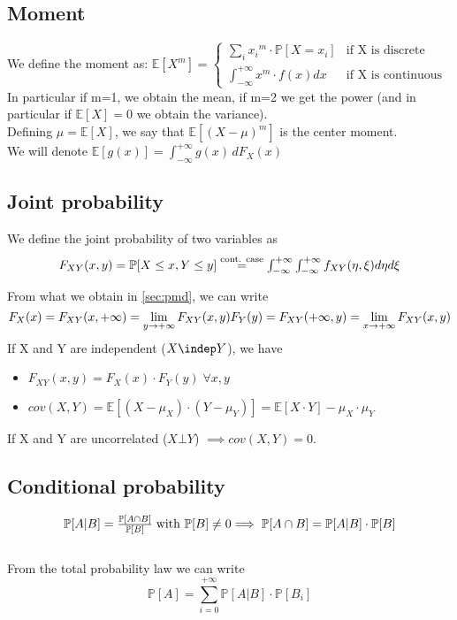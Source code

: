 \subsection{Moment}
We define  the moment as:
$\mathbb{E}[X^m]=
\begin{cases}
    \sum\limits_{i} {x{_i}^{m} \cdot \mathbb{P}[X=x_i]} & \text{if X is discrete } \\
    \int_{-\infty}^{+\infty} {x^{m} \cdot f(x) dx }  & \text{if X is continuous}
\end{cases}$
In particular if m=1, we obtain the mean, if m=2 we get the power (and in particular if $\mathbb{E}[X]=0$ we obtain the variance).\\
Defining $\mu = \mathbb{E}[X]$, we say that $\mathbb{E}[(X-\mu)^m]$ is the center moment.\\
We will denote $\mathbb{E}[g(x)]=\int_{-\infty}^{+\infty} g(x)\, d F_X(x)$

\subsection{Joint probability}
We define the joint probability of two variables as
\begin{equation*}
  $$F_{XY}(x,y)=\mathbb{P}[X\le x , Y \le y] \stackrel{\text{cont. case}}{=} \int_{-\infty}^{+\infty}\int_{-\infty}^{+\infty} f_{XY}(\eta,\xi) d\eta d\xi$$
\end{equation*}

From what we obtain in \ref{sec:pmd}, we can write \\
\begin{equation*}
  $$F_X(x)=F_{XY}(x,+\infty)=\lim\limits_{y \to +\infty} F_{XY}(x,y)$$
  $$F_Y(y)=F_{XY}(+\infty,y)=\lim\limits_{x \to +\infty} F_{XY}(x,y)$$
\end{equation*}
If X and Y are independent ($X \indep Y$), we have
\begin{itemize}
  \item $F_{XY}(x,y)=F_X(x)\cdot F_Y(y) \; \forall x,y$
  \item $cov(X,Y) = \mathbb{E}[(X - \mu_X)\cdot (Y - \mu_Y)] = \mathbb{E}[X \cdot Y]-\mu_X \cdot \mu_Y$
\end{itemize}
If X and Y are uncorrelated ($X \bot Y$) $\implies cov(X,Y)=0$.

\subsection{Conditional probability}
\begin{equation}
  $$\mathbb{P}[A | B]= \frac{\mathbb{P}[A \cap B]}{\mathbb{P}[B]} \; \text{with $\mathbb{P}[B]\ne 0$}$$ \\
  $$\implies \mathbb{P}[A \cap B ] = \mathbb{P}[A | B ]\cdot \mathbb{P}[B]$$
\end{equation}\\
From the total probability law we can write\\
$$\mathbb{P}[A]= \sum\limits_{i=0}^{+\infty}\mathbb{P}[A|B]\cdot \mathbb{P}[B_i]$$


